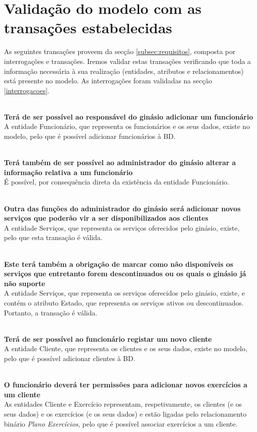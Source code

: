 \section{Validação do modelo com as transações estabelecidas}
\label{transacoes}

As seguintes transações proveem da secção \ref{subsec:requisitos}, composta por interrogações e transações. Iremos validar estas transações verificando que toda a informação necessária à sua realização (entidades, atributos e relacionamentos) está presente no modelo. As interrogações foram validadas na secção \ref{interrogacoes}.


\noindent
\\\textbf{Terá de ser possível ao responsável do ginásio adicionar um funcionário}
\\ A entidade Funcionário, que representa os funcionários e os seus dados, existe no modelo, pelo que é possível adicionar funcionários à BD.

\noindent
\\\textbf{Terá também  de ser possível ao administrador do ginásio alterar a informação relativa a um funcionário}
\\ É possível, por consequência direta da existência da entidade Funcionário.

\noindent
\\\textbf{Outra das funções do administrador do ginásio será adicionar novos serviços que poderão vir a ser disponibilizados aos clientes}
\\ A entidade Serviços, que representa os serviços oferecidos pelo ginásio, existe, pelo que esta transação é válida.

\noindent
\\\textbf{Este terá também a obrigação de marcar como não disponíveis os serviços que entretanto forem descontinuados ou os quais o ginásio já não suporte}
\\  A entidade Serviços, que representa os serviços oferecidos pelo ginásio, existe, e contém o atributo Estado, que representa os serviços ativos ou descontinuados. Portanto, a transação é válida.

\noindent
\\\textbf{Terá de ser possível ao funcionário registar um novo cliente}
\\ A entidade Cliente, que representa os clientes e os seus dados, existe no modelo, pelo que é possível adicionar clientes à BD.

\noindent
\\\textbf{O funcionário deverá ter permissões para adicionar novos exercícios a um cliente}
\\ As entidades Cliente e Exercício representam, respetivamente, os clientes (e os seus dados) e os exercícios (e os seus dados) e estão ligadas pelo relacionamento binário \emph{Plano Exercícios}, pelo que é possível associar exercícios a um cliente.

